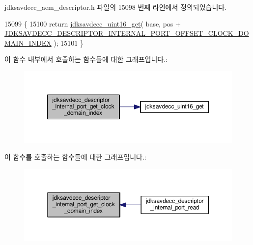 jdksavdecc\+\_\+aem\+\_\+descriptor.\+h 파일의 15098 번째 라인에서 정의되었습니다.


\begin{DoxyCode}
15099 \{
15100     \textcolor{keywordflow}{return} \hyperlink{group__endian_ga3fbbbc20be954aa61e039872965b0dc9}{jdksavdecc\_uint16\_get}( base, pos + 
      \hyperlink{group__descriptor__internal__port_gad5dcf305ef3caee9b76f6c8c86fbf32b}{JDKSAVDECC\_DESCRIPTOR\_INTERNAL\_PORT\_OFFSET\_CLOCK\_DOMAIN\_INDEX}
       );
15101 \}
\end{DoxyCode}


이 함수 내부에서 호출하는 함수들에 대한 그래프입니다.\+:
\nopagebreak
\begin{figure}[H]
\begin{center}
\leavevmode
\includegraphics[width=350pt]{group__descriptor__internal__port_gaa2fc99cc0fb83ba752ea98fdbe342b44_cgraph}
\end{center}
\end{figure}




이 함수를 호출하는 함수들에 대한 그래프입니다.\+:
\nopagebreak
\begin{figure}[H]
\begin{center}
\leavevmode
\includegraphics[width=350pt]{group__descriptor__internal__port_gaa2fc99cc0fb83ba752ea98fdbe342b44_icgraph}
\end{center}
\end{figure}


